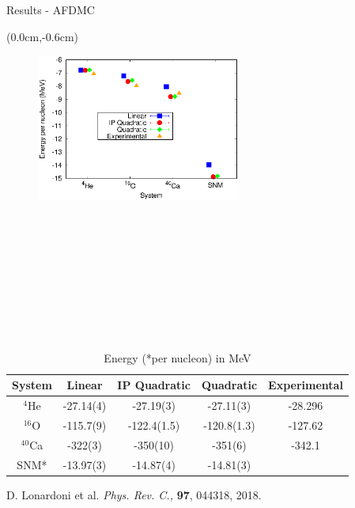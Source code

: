 \documentclass{beamer}
\begin{document}
\begin{frame}{Results - AFDMC}
\begin{textblock*}{\textwidth}(0.0cm,-0.6cm) %
\begin{figure}[h]
   \centering
   \includegraphics[width=0.6\textwidth]{../figures/energy.eps}
\end{figure}
\end{textblock*}
~\\~\\~\\~\\~\\~\\~\\~\\
\tiny
\begin{table}[htb]
\centering
\caption[]{Energy (*per nucleon) in MeV}
\begin{tabular}{ccccc}
\hline\hline
System & Linear & IP Quadratic & Quadratic & Experimental\\
\hline
${}^{4}${He}   & -27.14(4) & -27.19(3)    & -27.11(3)    & -28.296   \\
${}^{16}${O}   & -115.7(9) & -122.4(1.5)  & -120.8(1.3)  & -127.62   \\
${}^{40}${Ca}  & -322(3)   & -350(10)     & -351(6)      & -342.1    \\
SNM*           & -13.97(3) & -14.87(4)    & -14.81(3)    &           \\
\hline\hline
\end{tabular}
\label{tab:psi2}
\end{table}
{\tiny D. Lonardoni et al. \textit{Phys. Rev. C.,} \textbf{97}, 044318, 2018.}
\end{frame}
\end{document}
